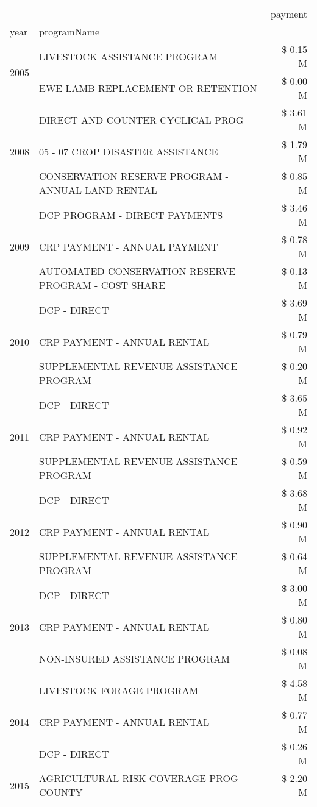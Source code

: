 \begin{tabular}{llr}
\toprule
 &  & payment \\
year & programName &  \\
\midrule
\multirow[t]{2}{*}{2005} & LIVESTOCK ASSISTANCE PROGRAM & \$ 0.15 M \\
 & EWE LAMB REPLACEMENT OR RETENTION & \$ 0.00 M \\
\cline{1-3}
\multirow[t]{3}{*}{2008} & DIRECT AND COUNTER CYCLICAL PROG & \$ 3.61 M \\
 & 05 - 07 CROP DISASTER ASSISTANCE & \$ 1.79 M \\
 & CONSERVATION RESERVE PROGRAM - ANNUAL LAND RENTAL & \$ 0.85 M \\
\cline{1-3}
\multirow[t]{3}{*}{2009} & DCP PROGRAM - DIRECT PAYMENTS & \$ 3.46 M \\
 & CRP PAYMENT - ANNUAL PAYMENT & \$ 0.78 M \\
 & AUTOMATED CONSERVATION RESERVE PROGRAM - COST SHARE & \$ 0.13 M \\
\cline{1-3}
\multirow[t]{3}{*}{2010} & DCP - DIRECT & \$ 3.69 M \\
 & CRP PAYMENT - ANNUAL RENTAL & \$ 0.79 M \\
 & SUPPLEMENTAL REVENUE ASSISTANCE PROGRAM & \$ 0.20 M \\
\cline{1-3}
\multirow[t]{3}{*}{2011} & DCP - DIRECT & \$ 3.65 M \\
 & CRP PAYMENT - ANNUAL RENTAL & \$ 0.92 M \\
 & SUPPLEMENTAL REVENUE ASSISTANCE PROGRAM & \$ 0.59 M \\
\cline{1-3}
\multirow[t]{3}{*}{2012} & DCP - DIRECT & \$ 3.68 M \\
 & CRP PAYMENT - ANNUAL RENTAL & \$ 0.90 M \\
 & SUPPLEMENTAL REVENUE ASSISTANCE PROGRAM & \$ 0.64 M \\
\cline{1-3}
\multirow[t]{3}{*}{2013} & DCP - DIRECT & \$ 3.00 M \\
 & CRP PAYMENT - ANNUAL RENTAL & \$ 0.80 M \\
 & NON-INSURED ASSISTANCE PROGRAM & \$ 0.08 M \\
\cline{1-3}
\multirow[t]{3}{*}{2014} & LIVESTOCK FORAGE PROGRAM & \$ 4.58 M \\
 & CRP PAYMENT - ANNUAL RENTAL & \$ 0.77 M \\
 & DCP - DIRECT & \$ 0.26 M \\
\cline{1-3}
\multirow[t]{3}{*}{2015} & AGRICULTURAL RISK COVERAGE PROG - COUNTY & \$ 2.20 M \\

\end{tabular}
